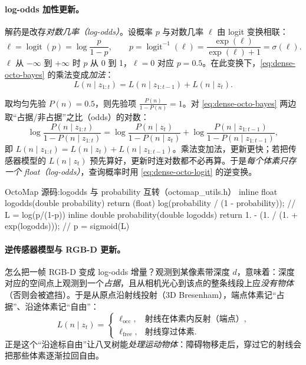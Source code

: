\paragraph{log-odds 加性更新。}
解药是改存\emph{对数几率（log-odds）}。设概率 $p$ 与对数几率 $\ell$ 由 logit 变换相联：
\begin{equation}
  \ell=\operatorname{logit}(p)=\log\!\frac{p}{1-p},\qquad
  p=\operatorname{logit}^{-1}(\ell)=\frac{\exp(\ell)}{\exp(\ell)+1}=\sigma(\ell).
  \label{eq:dense-octo-logit}
\end{equation}
$\ell$ 从 $-\infty$ 到 $+\infty$ 时 $p$ 从 0 到 1，$\ell=0$ 对应 $p=0.5$。在此变换下，\cref{eq:dense-octo-bayes} 的乘法变成\emph{加法}：
\begin{equation}
  L(n\mid z_{1:t})=L(n\mid z_{1:t-1})+L(n\mid z_t).
  \label{eq:dense-octo-logodds}
\end{equation}

\begin{derivation}
取均匀先验 $P(n)=0.5$，则先验项 $\frac{P(n)}{1-P(n)}=1$。对 \cref{eq:dense-octo-bayes} 两边取“占据/非占据”之比（odds）的对数：
\[
  \log\frac{P(n\mid z_{1:t})}{1-P(n\mid z_{1:t})}
  =\log\frac{P(n\mid z_t)}{1-P(n\mid z_t)}+\log\frac{P(n\mid z_{1:t-1})}{1-P(n\mid z_{1:t-1})},
\]
即 $L(n\mid z_{1:t})=L(n\mid z_t)+L(n\mid z_{1:t-1})$。乘法变加法，更新更快；若把传感器模型的 $L(n\mid z_t)$ 预先算好，更新时连对数都不必再算。于是\emph{每个体素只存一个 float（log-odds）}，查询概率时用 \cref{eq:dense-octo-logit} 的逆变换。
\end{derivation}

\begin{codebox}[C++]{OctoMap 源码:logodds 与 probability 互转（octomap\_utils.h）}
inline float logodds(double probability) {
  return (float) log(probability / (1 - probability));    // L = log(p/(1-p))
}
inline double probability(double logodds) {
  return 1. - (1. / (1. + exp(logodds)));                 // p = sigmoid(L)
}
\end{codebox}

\paragraph{逆传感器模型与 RGB-D 更新。}
怎么把一帧 RGB-D 变成 log-odds 增量？观测到某像素带深度 $d$，意味着：深度对应的空间点上观测到一个\emph{占据}，且从相机光心到该点的整条线段上应\emph{没有物体}（否则会被遮挡）。于是从原点沿射线投射（3D Bresenham），端点体素记“占据”、沿途体素记“自由”：
\begin{equation}
  L(n\mid z_t)=\begin{cases} \ell_{\mathrm{occ}}, & \text{射线在体素内反射（端点）},\\ \ell_{\mathrm{free}}, & \text{射线穿过体素}.\end{cases}
  \label{eq:dense-octo-sensor}
\end{equation}
正是这个“沿途标自由”让八叉树能\emph{处理运动物体}：障碍物移走后，穿过它的射线会把那些体素逐渐拉回自由。

